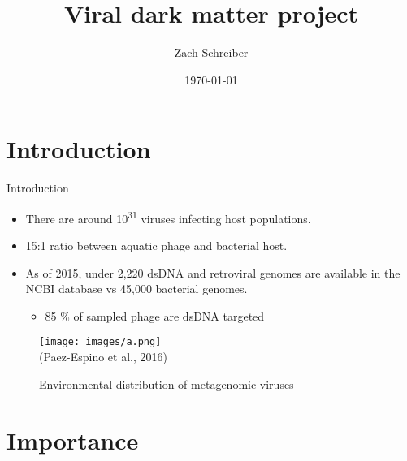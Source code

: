 \documentclass{beamer}
\title[]{Viral dark matter project}
\author[]{Zach Schreiber}
\institute[]{Delaware Biotechnology Institute}
\date{\today}
\begin{document}
\section{Introduction}

\begin{frame}{Introduction}

\begin{itemize}
  \item There are around 10\textsuperscript{31} viruses infecting host populations.
  \item 15:1 ratio between aquatic phage and bacterial host.
  \item As of 2015, under 2,220 dsDNA and retroviral genomes are available in the NCBI database vs 45,000       		        bacterial genomes.
  	\begin{itemize}
  		\item 85 \% of sampled phage are dsDNA targeted
  	\end{itemize}
  
\end{itemize}

\begin{figure}
\centering
\texttt{[image: images/a.png]}\\[-1ex]
{\tiny (Paez-Espino et al., 2016)}
\caption{Environmental distribution of metagenomic viruses}
\label{fig:1}
\end{figure}

\end{frame}

\section{Importance}
\end{document}
